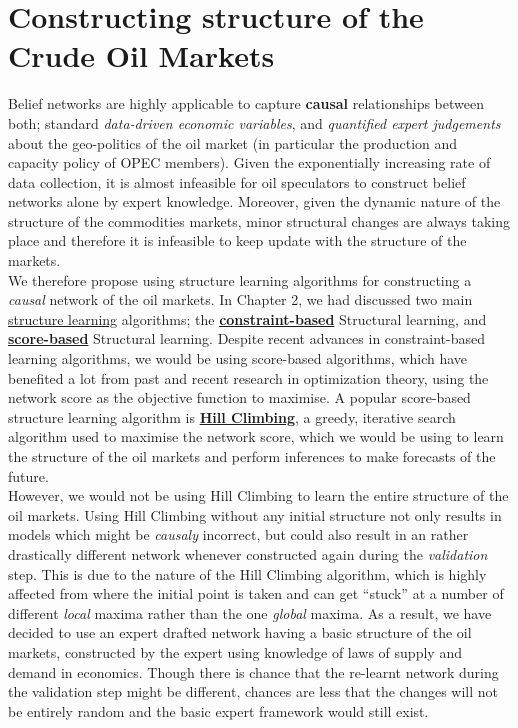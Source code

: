 \section{Constructing structure of the Crude Oil Markets}

Belief networks are highly applicable to capture \textbf{causal} relationships between both; standard \textit{data-driven economic variables}, and \textit{quantified expert judgements} about the geo-politics of the oil market (in particular the production and capacity policy of OPEC members). Given the exponentially increasing rate of data collection, it is almost infeasible for oil speculators to construct belief networks alone by expert knowledge. Moreover, given the dynamic nature of the structure of the commodities markets, minor structural changes are always taking place and therefore it is infeasible to keep update with the structure of the markets. \\

We therefore propose using structure learning algorithms for constructing a \textit{causal} network of the oil markets. In Chapter 2, we had discussed two main \hyperref[structure]{structure learning} algorithms; the \hyperref[constraint]{\textbf{constraint-based}} Structural learning, and  \hyperref[scorebased]{\textbf{score-based}} Structural learning. Despite recent advances in constraint-based learning algorithms\cite{pellet2008using}, we would be using score-based algorithms, which have benefited a lot from past and recent research in optimization theory, using the network score as the objective function to maximise\cite{scutari2014bayesian}. A popular score-based structure learning algorithm is \hyperref[scorebased]{\textbf{Hill Climbing}}, a greedy, iterative search algorithm used to maximise the network score, which we would be using to learn the structure of the oil markets and perform inferences to make forecasts of the future. \\


However, we would not be using Hill Climbing to learn the entire structure of the oil markets. Using Hill Climbing without any initial structure not only results in models which might be \textit{causaly} incorrect, but could also result in an rather drastically different network whenever constructed again during the \textit{validation} step. This is due to the nature of the Hill Climbing algorithm, which is highly affected from where the initial point is taken and can get \enquote{stuck} at a number of different \textit{local} maxima rather than the one \textit{global} maxima. As a result, we have decided to use an expert drafted network having a basic structure of the oil markets, constructed by the expert using knowledge of laws of supply and demand in economics. Though there is chance that the re-learnt network during the validation step might be different, chances are less that the changes will not be entirely random and the basic expert framework would still exist. \\

